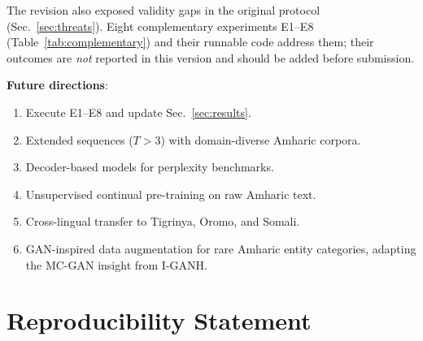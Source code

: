 \documentclass[11pt,a4paper]{article}
\begin{document}
The revision also exposed validity gaps in the original protocol
(Sec.~\ref{sec:threats}).  Eight complementary experiments E1--E8
(Table~\ref{tab:complementary}) and their runnable code address them;
their outcomes are \emph{not} reported in this version and should be
added before submission.

\textbf{Future directions}:
\begin{enumerate}
  \item Execute E1--E8 and update Sec.~\ref{sec:results}.
  \item Extended sequences ($T > 3$) with domain-diverse Amharic corpora.
  \item Decoder-based models for perplexity benchmarks.
  \item Unsupervised continual pre-training on raw Amharic text.
  \item Cross-lingual transfer to Tigrinya, Oromo, and Somali.
  \item GAN-inspired data augmentation for rare Amharic entity
        categories, adapting the MC-GAN insight from I-GANH.
\end{enumerate}

\section{Reproducibility Statement}
\label{sec:reproducibility}
\end{document}
